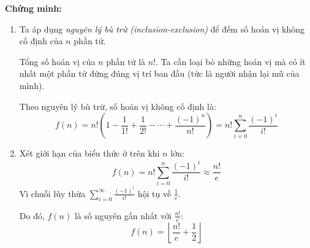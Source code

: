 \documentclass{article}
\begin{document}
	\textbf{Chứng minh:}
	
	\begin{enumerate}[label=(\alph*)]
		\item
		Ta áp dụng \textit{nguyên lý bù trừ (inclusion-exclusion)} để đếm số hoán vị không cố định của $n$ phần tử.
		
		Tổng số hoán vị của $n$ phần tử là $n!$. Ta cần loại bỏ những hoán vị mà có ít nhất một phần tử đứng đúng vị trí ban đầu (tức là người nhận lại mũ của mình).
		
		Theo nguyên lý bù trừ, số hoán vị không cố định là:
		\[
		f(n) = n! \left(1 - \frac{1}{1!} + \frac{1}{2!} - \cdots + \frac{(-1)^n}{n!} \right) = n! \sum_{i=0}^{n} \frac{(-1)^i}{i!}
		\]
		
		\item
		Xét giới hạn của biểu thức ở trên khi $n$ lớn:
		\[
		f(n) = n! \sum_{i=0}^{n} \frac{(-1)^i}{i!} \approx \frac{n!}{e}
		\]
		Vì chuỗi lũy thừa $\sum_{i=0}^{\infty} \frac{(-1)^i}{i!}$ hội tụ về $\frac{1}{e}$.
		
		Do đó, $f(n)$ là số nguyên gần nhất với $\frac{n!}{e}$:
		\[
		f(n) = \left\lfloor \frac{n!}{e} + \frac{1}{2} \right\rfloor
		\]
		
	\end{enumerate}
	
\end{document}
